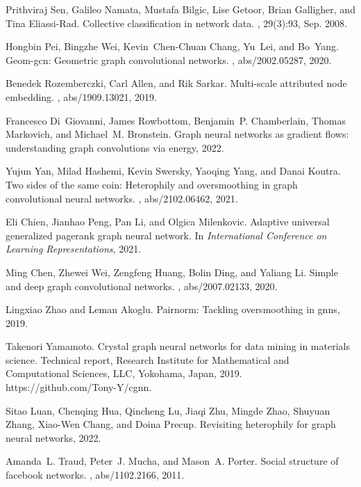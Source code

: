 \documentclass{article}
\theoremstyle{plain}
\theoremstyle{definition}
\begin{document}
{\begin{thebibliography}{10}
Prithviraj Sen, Galileo Namata, Mustafa Bilgic, Lise Getoor, Brian Galligher,
  and Tina Eliassi-Rad.
\newblock Collective classification in network data.
, 29(3):93, Sep. 2008.

Hongbin Pei, Bingzhe Wei, Kevin~Chen{-}Chuan Chang, Yu~Lei, and Bo~Yang.
\newblock Geom-gcn: Geometric graph convolutional networks.
, abs/2002.05287, 2020.

Benedek Rozemberczki, Carl Allen, and Rik Sarkar.
\newblock Multi-scale attributed node embedding.
, abs/1909.13021, 2019.

Francesco Di~Giovanni, James Rowbottom, Benjamin~P. Chamberlain, Thomas
  Markovich, and Michael~M. Bronstein.
\newblock Graph neural networks as gradient flows: understanding graph
  convolutions via energy, 2022.

Yujun Yan, Milad Hashemi, Kevin Swersky, Yaoqing Yang, and Danai Koutra.
\newblock Two sides of the same coin: Heterophily and oversmoothing in graph
  convolutional neural networks.
, abs/2102.06462, 2021.

Eli Chien, Jianhao Peng, Pan Li, and Olgica Milenkovic.
\newblock Adaptive universal generalized pagerank graph neural network.
\newblock In {\em International Conference on Learning Representations}, 2021.

Ming Chen, Zhewei Wei, Zengfeng Huang, Bolin Ding, and Yaliang Li.
\newblock Simple and deep graph convolutional networks.
, abs/2007.02133, 2020.

Lingxiao Zhao and Leman Akoglu.
\newblock Pairnorm: Tackling oversmoothing in gnns, 2019.

Takenori Yamamoto.
\newblock Crystal graph neural networks for data mining in materials science.
\newblock Technical report, Research Institute for Mathematical and
  Computational Sciences, LLC, Yokohama, Japan, 2019.
\newblock https://github.com/Tony-Y/cgnn.

Sitao Luan, Chenqing Hua, Qincheng Lu, Jiaqi Zhu, Mingde Zhao, Shuyuan Zhang,
  Xiao-Wen Chang, and Doina Precup.
\newblock Revisiting heterophily for graph neural networks, 2022.

Amanda~L. Traud, Peter~J. Mucha, and Mason~A. Porter.
\newblock Social structure of facebook networks.
, abs/1102.2166, 2011.


\end{thebibliography}}
\end{document}
